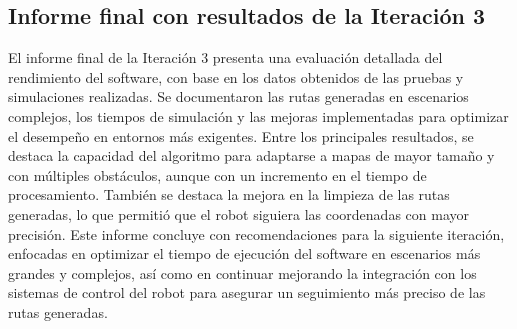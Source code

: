 \subsection{Informe final con resultados de la Iteraci\'on 3}
    El informe final de la Iteraci\'on 3 presenta una evaluaci\'on
        detallada del rendimiento del software, con base en los datos
        obtenidos de las pruebas y simulaciones realizadas. Se
        documentaron las rutas generadas en escenarios complejos,
        los tiempos de simulaci\'on y las mejoras implementadas para
        optimizar el desempe\~no en entornos m\'as exigentes.
    \vskip 0.5cm
    Entre los principales resultados, se destaca la capacidad del
        algoritmo para adaptarse a mapas de mayor tama\~no y con
        m\'ultiples obst\'aculos, aunque con un incremento en el tiempo
        de procesamiento. Tambi\'en se destaca la mejora en la
        limpieza de las rutas generadas, lo que permiti\'o que el robot
        siguiera las coordenadas con mayor precisi\'on.
    \vskip 0.5cm
    Este informe concluye con recomendaciones para la
        siguiente iteraci\'on, enfocadas en optimizar el tiempo de
        ejecuci\'on del software en escenarios m\'as grandes y
        complejos, as\'i como en continuar mejorando la integraci\'on
        con los sistemas de control del robot para asegurar un
        seguimiento m\'as preciso de las rutas generadas.
    \vskip 0.5cm